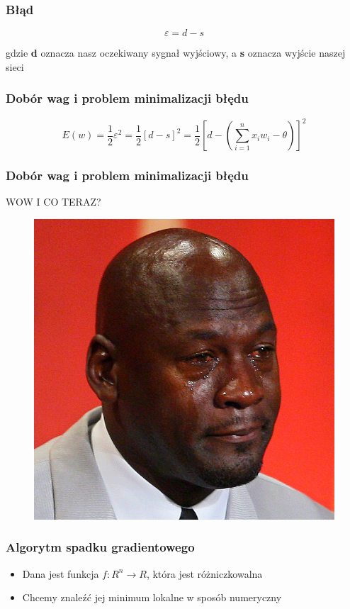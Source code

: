 \documentclass[16pt]{beamer}
\begin{document}
\begin{frame}
\frametitle{Błąd}
\begin{center}
\[
\varepsilon = d - s
\]
\end{center}
gdzie \textbf{d} oznacza nasz oczekiwany sygnał wyjściowy, a \textbf{s} oznacza wyjście naszej sieci
\end{frame}

\begin{frame}
\frametitle{Dobór wag i problem minimalizacji błędu}
\[
E(w) = \frac{1}{2}\varepsilon^2 = \frac{1}{2}\left[d - s\right]^2 = \frac{1}{2}\left[d - (\sum_{i=1}^{n}x_iw_i - \theta)\right]^2
\]
\end{frame}

\begin{frame}
\frametitle{Dobór wag i problem minimalizacji błędu}
\begin{center}
WOW I CO TERAZ?
\end{center}
\begin{figure}[ht]
\includegraphics[scale=0.65]{./cry.jpg}
\end{figure}
\end{frame}

\begin{frame}
\frametitle{Algorytm spadku gradientowego}
\begin{itemize}
	\item Dana jest funkcja $f:R^n \to R$, która jest różniczkowalna
	\item Chcemy znaleźć jej minimum lokalne w sposób numeryczny
\end{itemize}
\end{frame}
\end{document}
